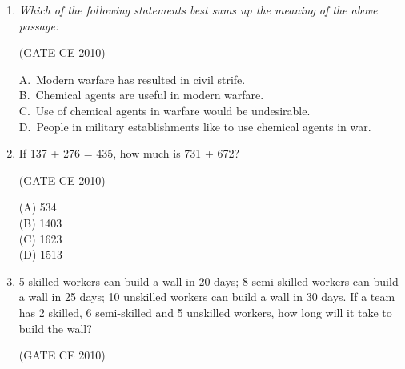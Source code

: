 \documentclass[journal,12pt,onecolumn]{exam}
\theoremstyle{remark}
\begin{document}
\begin{enumerate}
\begin{multicols}{4}
\noindent(A) 2\\
(B) 17\\
(C) 13\\
(D) 3
\end{multicols}

\setlength{\parskip}{0.5cm}


\setlength{\parskip}{0.5cm}

 \textit{Modern warfare has changed from large scale clashes of armies to suppression of civilian populations. Chemical agents that do their work silently appear to be suited to such warfare; and regretfully, there exist people in military establishments who think that chemical agents are useful tools for their cause.}

\vspace{0.3cm}
\noindent\item\textit{ Which of the following statements best sums up the meaning of the above passage:}

\hfill{(GATE CE 2010)}

A.\ Modern warfare has resulted in civil strife. \\
B.\ Chemical agents are useful in modern warfare.\\
C.\ Use of chemical agents in warfare would be undesirable. \\
D.\ People in military establishments like to use chemical agents in war.

\noindent\item If 137 + 276 = 435, how much is 731 + 672?

\hfill{(GATE CE 2010)}

\begin{multicols}{4}
\noindent(A) 534\\
(B) 1403\\
(C) 1623\\
(D) 1513
\end{multicols}

\setlength{\parskip}{0.5cm}

\noindent\item 5 skilled workers can build a wall in 20 days; 8 semi-skilled workers can build a wall in 25 days; 10 unskilled workers can build a wall in 30 days. If a team has 2 skilled, 6 semi-skilled and 5 unskilled workers, how long will it take to build the wall?

\hfill{(GATE CE 2010)}


\end{enumerate}
\end{document}

